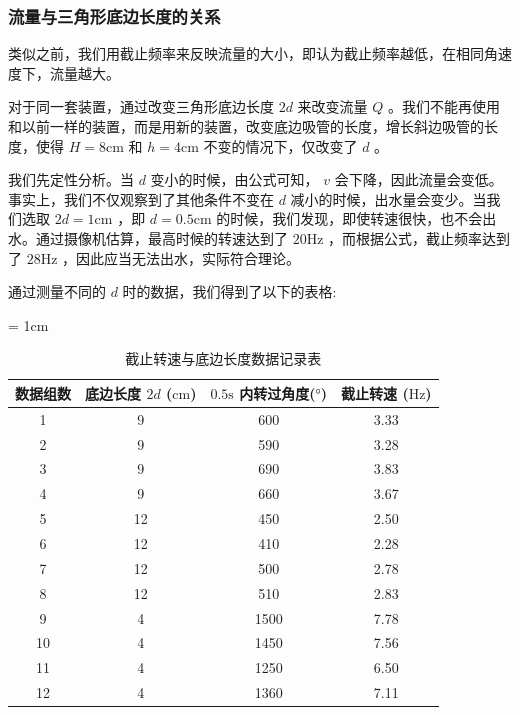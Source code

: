 \documentclass[fontset=windows]{article}
\begin{document}
\subsubsection{流量与三角形底边长度的关系}

类似之前，我们用截止频率来反映流量的大小，即认为截止频率越低，在相同角速度下，流量越大。

对于同一套装置，通过改变三角形底边长度 $2d$ 来改变流量 $Q$ 。我们不能再使用和以前一样的装置，而是用新的装置，改变底边吸管的长度，增长斜边吸管的长度，使得 $H = 8\text{cm}$ 和 $h=4\text{cm}$ 不变的情况下，仅改变了 $d$ 。

我们先定性分析。当 $d$ 变小的时候，由公式可知， $v$ 会下降，因此流量会变低。事实上，我们不仅观察到了其他条件不变在 $d$ 减小的时候，出水量会变少。当我们选取 $2d = 1\text{cm}$ ，即 $d = 0.5\text{cm}$ 的时候，我们发现，即使转速很快，也不会出水。通过摄像机估算，最高时候的转速达到了 $20\text{Hz}$ ，而根据公式，截止频率达到了 $28\text{Hz}$ ，因此应当无法出水，实际符合理论。

通过测量不同的 $d$ 时的数据，我们得到了以下的表格:

\begin{table}[htbp]
    \centering
    \caption{截止转速与底边长度数据记录表}
    \label{table3}
    \renewcommand\arraystretch{1.5}
    \tabcolsep = 1cm
    \begin{tabular}{|c|c|c|c|}
        \hline
        数据组数 & 底边长度 $2d$ ($\text{cm}$) & $0.5\text{s}$ 内转过角度($\text{°}$)  & 截止转速 ($\text{Hz}$) \\
        \hline
        1 & 9 & 600 & 3.33 \\
        \hline
        2 & 9 & 590 & 3.28 \\
        \hline
        3 & 9 & 690 & 3.83 \\
        \hline
        4 & 9 & 660 & 3.67 \\
        \hline
        5 & 12 & 450 & 2.50 \\ 
        \hline
        6 & 12 & 410 & 2.28 \\
        \hline
        7 & 12 & 500 & 2.78 \\
        \hline
        8 & 12 & 510 & 2.83 \\
        \hline
        9 & 4  & 1500 & 7.78 \\
        \hline
        10 & 4 & 1450 & 7.56 \\
        \hline
        11 & 4 & 1250 & 6.50 \\
        \hline
        12 & 4 & 1360 & 7.11 \\
        \hline
    \end{tabular}
\end{table}
\end{document}
